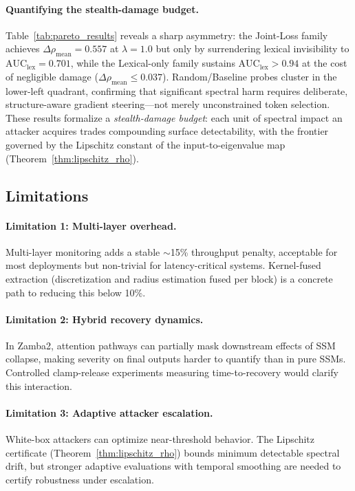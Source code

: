 \documentclass[10pt,twocolumn]{article}
\begin{document}
\paragraph{Quantifying the stealth-damage budget.}
Table~\ref{tab:pareto_results} reveals a sharp asymmetry: the Joint-Loss family achieves $\Delta\rho_{\text{mean}} = 0.557$ at $\lambda=1.0$ but only by surrendering lexical invisibility to $\text{AUC}_{\text{lex}} = 0.701$, while the Lexical-only family sustains $\text{AUC}_{\text{lex}} > 0.94$ at the cost of negligible damage ($\Delta\rho_{\text{mean}} \le 0.037$). Random/Baseline probes cluster in the lower-left quadrant, confirming that significant spectral harm requires deliberate, structure-aware gradient steering---not merely unconstrained token selection. These results formalize a \emph{stealth-damage budget}: each unit of spectral impact an attacker acquires trades compounding surface detectability, with the frontier governed by the Lipschitz constant of the input-to-eigenvalue map (Theorem~\ref{thm:lipschitz_rho}).
\subsection{Limitations}

\paragraph{Limitation 1: Multi-layer overhead.}
Multi-layer monitoring adds a stable $\sim$15\% throughput penalty, acceptable for most deployments but non-trivial for latency-critical systems. Kernel-fused extraction (discretization and radius estimation fused per block) is a concrete path to reducing this below 10\%.

\paragraph{Limitation 2: Hybrid recovery dynamics.}
In Zamba2, attention pathways can partially mask downstream effects of SSM collapse, making severity on final outputs harder to quantify than in pure SSMs. Controlled clamp-release experiments measuring time-to-recovery would clarify this interaction.

\paragraph{Limitation 3: Adaptive attacker escalation.}
White-box attackers can optimize near-threshold behavior. The Lipschitz certificate (Theorem~\ref{thm:lipschitz_rho}) bounds minimum detectable spectral drift, but stronger adaptive evaluations with temporal smoothing are needed to certify robustness under escalation.
\end{document}
